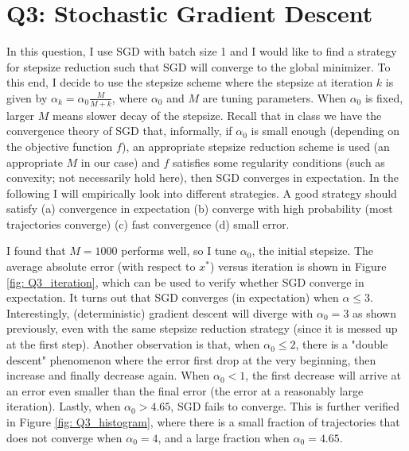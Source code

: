 \documentclass{article}
\begin{document}
\section*{Q3: Stochastic Gradient Descent}
In this question, I use SGD with batch size 1 and I would like to find a strategy for stepsize reduction such that SGD will converge to the global minimizer. To this end, I decide to use the stepsize scheme where the stepsize at iteration $ k $ is given by $ \alpha_k = \alpha_0 \frac{M}{M+k} $, where $ \alpha_0 $ and $ M $ are tuning parameters. When $ \alpha_0 $ is fixed, larger $ M $ means slower decay of the stepsize. Recall that in class we have the convergence theory of SGD that, informally, if $ \alpha_0 $ is small enough (depending on the objective function $ f $),  an appropriate stepsize reduction scheme is used (an appropriate $ M $ in our case) and $ f $ satisfies some regularity conditions (such as convexity; not necessarily hold here), then SGD converges in expectation. In the following I will empirically look into different strategies. A good strategy should satisfy (a) convergence in expectation (b) converge with high probability (most trajectories converge) (c) fast convergence (d)  small error.


I found that $ M = 1000 $ performs well, so I tune $ \alpha_0 $, the initial stepsize. The average absolute error (with respect to $ x^{*} $) versus iteration is shown in Figure \ref{fig: Q3_iteration}, which can be used to verify whether SGD converge in expectation. It turns out that SGD converges (in expectation) when $ \alpha \leq 3 $. Interestingly, (deterministic) gradient descent will diverge with $ \alpha_0 = 3 $ as shown previously, even with the same stepsize reduction strategy (since it is messed up at the first step). Another observation is that, when $ \alpha_0 \leq 2 $, there is a "double descent" phenomenon where the error first drop at the very beginning, then increase and finally decrease again. When $ \alpha_0 <1 $, the first decrease will arrive at an error even smaller than the final error (the error at a reasonably large iteration). Lastly, when $ \alpha_0 > 4.65 $, SGD fails to converge. This is further verified in Figure \ref{fig: Q3_histogram}, where there is a small fraction of trajectories that does not converge when $ \alpha_0 = 4 $, and a large fraction when $ \alpha_0 = 4.65 $.
\end{document}
